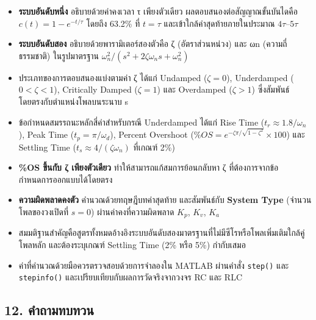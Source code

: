 \begin{itemize}
    \item \textbf{ระบบอันดับหนึ่ง} อธิบายด้วยค่าคงเวลา τ เพียงตัวเดียว ผลตอบสนองต่อสัญญาณขั้นบันไดคือ $c(t)=1-e^{-t/\tau}$ โดยถึง 63.2\% ที่ $t=\tau$ และเข้าใกล้ค่าสุดท้ายภายในประมาณ $4\tau$–$5\tau$
    \item \textbf{ระบบอันดับสอง} อธิบายด้วยพารามิเตอร์สองตัวคือ ζ (อัตราส่วนหน่วง) และ ωn (ความถี่ธรรมชาติ) ในรูปมาตรฐาน $\omega_n^2/(s^2+2\zeta\omega_n s+\omega_n^2)$
    \item ประเภทของการตอบสนองแบ่งตามค่า ζ ได้แก่ Undamped ($\zeta=0$), Underdamped ($0<\zeta<1$), Critically Damped ($\zeta=1$) และ Overdamped ($\zeta>1$) ซึ่งสัมพันธ์โดยตรงกับตำแหน่งโพลบนระนาบ s
    \item ข้อกำหนดสมรรถนะหลักสี่ค่าสำหรับกรณี Underdamped ได้แก่ Rise Time ($t_r\approx1.8/\omega_n$), Peak Time ($t_p=\pi/\omega_d$), Percent Overshoot ($\%OS=e^{-\zeta\pi/\sqrt{1-\zeta^2}}\times100$) และ Settling Time ($t_s\approx4/(\zeta\omega_n)$ ที่เกณฑ์ 2\%)
    \item \textbf{\%OS ขึ้นกับ ζ เพียงตัวเดียว} ทำให้สามารถแก้สมการย้อนกลับหา ζ ที่ต้องการจากข้อกำหนดการออกแบบได้โดยตรง
    \item \textbf{ความผิดพลาดคงตัว} คำนวณด้วยทฤษฎีบทค่าสุดท้าย และสัมพันธ์กับ \textbf{System Type} (จำนวนโพลของวงเปิดที่ $s=0$) ผ่านค่าคงที่ความผิดพลาด $K_p$, $K_v$, $K_a$
    \item สมมติฐานสำคัญคือสูตรทั้งหมดอ้างอิงระบบอันดับสองมาตรฐานที่ไม่มีซีโรหรือโพลเพิ่มเติมใกล้คู่โพลหลัก และต้องระบุเกณฑ์ Settling Time (2\% หรือ 5\%) กำกับเสมอ
    \item ค่าที่คำนวณด้วยมือควรตรวจสอบด้วยการจำลองใน MATLAB ผ่านคำสั่ง \texttt{step()} และ \texttt{stepinfo()} และเปรียบเทียบกับผลการวัดจริงจากวงจร RC และ RLC
\end{itemize}



\subsection{12. คำถามทบทวน}

